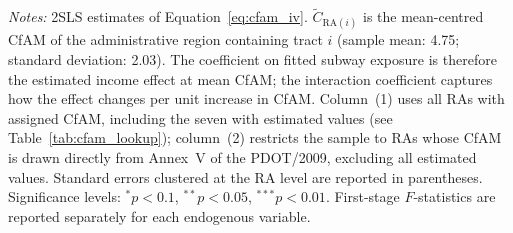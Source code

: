 \begin{table}[htbp]
\centering
\caption{Heterogeneity of the subway income effect by land-use permissibility (CfAM)}
\label{tab:cfam_het}
\begin{tablenotes}
\scriptsize
\item \textit{Notes:} 2SLS estimates of Equation~\eqref{eq:cfam_iv}. $\widetilde{C}_{\text{RA}(i)}$ is the mean-centred CfAM of the administrative region containing tract $i$ (sample mean: 4.75; standard deviation: 2.03). The coefficient on fitted subway exposure is therefore the estimated income effect at mean CfAM; the interaction coefficient captures how the effect changes per unit increase in CfAM. Column~(1) uses all RAs with assigned CfAM, including the seven with estimated values (see Table~\ref{tab:cfam_lookup}); column~(2) restricts the sample to RAs whose CfAM is drawn directly from Annex~V of the PDOT/2009, excluding all estimated values. Standard errors clustered at the RA level are reported in parentheses. Significance levels: $^{*}p<0.1$, $^{**}p<0.05$, $^{***}p<0.01$. First-stage $F$-statistics are reported separately for each endogenous variable.
\end{tablenotes}
\end{table}

